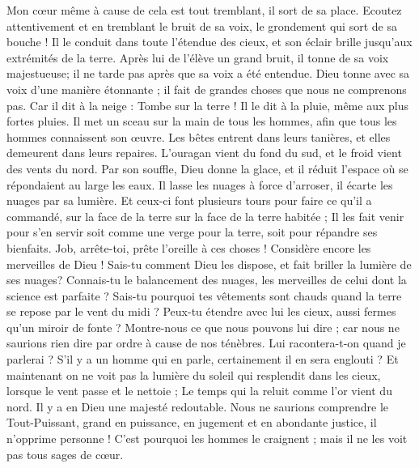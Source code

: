 \begin{multicols}{2}
\VerseOne{}Mon cœur même à cause de cela est tout tremblant, il sort de sa place.
Ecoutez attentivement et en tremblant le bruit de sa voix, le grondement qui sort de sa bouche !
Il le conduit dans toute l'étendue des cieux, et son éclair brille jusqu'aux extrémités de la terre.
Après lui de l'élève un grand bruit, il tonne de sa voix majestueuse; il ne tarde pas après que sa voix a été entendue.
Dieu tonne avec sa voix d'une manière étonnante ; il fait de grandes choses que nous ne comprenons pas.
Car il dit à la neige : Tombe sur la terre ! Il le dit à la pluie, même aux plus fortes pluies.
Il met un sceau sur la main de tous les hommes, afin que tous les hommes connaissent son œuvre.
Les bêtes entrent dans leurs tanières, et elles demeurent dans leurs repaires.
L'ouragan vient du fond du sud, et le froid vient des vents du nord.
Par son souffle, Dieu donne la glace, et il réduit l'espace où se répondaient au large les eaux.
Il lasse les nuages à force d'arroser, il écarte les nuages par sa lumière.
Et ceux-ci font plusieurs tours pour faire ce qu'il a commandé, sur la face de la terre sur la face de la terre habitée ;
Il les fait venir pour s'en servir soit comme une verge pour la terre, soit pour répandre ses bienfaits.
Job, arrête-toi, prête l'oreille à ces choses ! Considère encore les merveilles de Dieu !
Sais-tu comment Dieu les dispose, et fait briller la lumière de ses nuages?
Connais-tu le balancement des nuages, les merveilles de celui dont la science est parfaite ?
Sais-tu pourquoi tes vêtements sont chauds quand la terre se repose par le vent du midi ?
Peux-tu étendre avec lui les cieux, aussi fermes qu'un miroir de fonte ?
Montre-nous ce que nous pouvons lui dire ; car nous ne saurions rien dire par ordre à cause de nos ténèbres. 
Lui racontera-t-on quand je parlerai ? S'il y a un homme qui en parle, certainement il en sera englouti ?
Et maintenant on ne voit pas la lumière du soleil qui resplendit dans les cieux, lorsque le vent passe et le nettoie ;
Le temps qui la reluit comme l'or vient du nord. Il y a en Dieu une majesté redoutable.
Nous ne saurions comprendre le Tout-Puissant, grand en puissance, en jugement et en abondante justice, il n'opprime personne !
C'est pourquoi les hommes le craignent ; mais il ne les voit pas tous sages de cœur.

\end{multicols}
